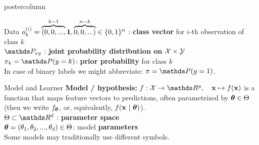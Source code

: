 \documentclass{beamer}
\begin{document}
\begin{frame}[fragile]{}
\begin{columns}
\begin{column}{.31\textwidth}
\begin{beamercolorbox}[center]{postercolumn}
\begin{minipage}{.98\textwidth}
{\begin{myblock}{Data}
$o_k^{(i)} = \overbrace{(0, 0, ...,}^{k - 1} \textbf{1},  \overbrace{0, 0, ...)}^{n - k}
\in \{0, 1\}^n$ : \textbf{class vector} for $i$-th observation of class $k$ \\
 
$\P_{xy}$ : \textbf{joint probability distribution on} $\mathcal{X} \times \mathcal{Y}$ \\

$\pi_k = \P(y = k)$:\textbf{ prior probability} for class $k$ \\
In case of binary labels we might abbreviate: $\pi = \P(y = 1)$.
  
\end{myblock}
\begin{myblock}{Model and Learner}
\textbf{Model / \textbf{hypothesis}: }$f : \Xspace \rightarrow \R^g, \quad \xv \mapsto \fx$ is a function that maps feature vectors to predictions, often parametrized by $\bm{\theta} \in \Theta$ \\ (then we write $f_{\bm{\theta}}$, or, equivalently, $f(\mathbf{x} ~|~ \bm{\theta})$). \\


$\Theta \subset \R^d$ : \textbf{parameter space} \\
  
$\bm{\theta} = (\theta_1, \theta_2, ..., \theta_d) \in \Theta$: model \textbf{parameters}\\
Some models may traditionally use different symbols. \\


\end{myblock}}
\end{minipage}
\end{beamercolorbox}
\end{column}
\end{columns}
\end{frame}
\end{document}
